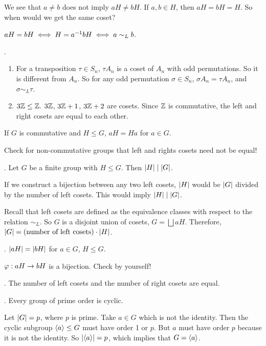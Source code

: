 We see that \(a \neq b\) does not imply \(aH \neq bH\). If \(a, b\in H\), then \(aH = bH = H\). So when would we get the same coset?

\rmk\(aH = bH \iff H = a^{-1} b H \iff a \sim_L b\).

\ex.
\begin{enumerate}
    \item For a transposition \(\tau \in S_n\), \(\tau A_n\) is a coset of \(A_n\) with odd permutations. So it is different from \(A_n\). So for any odd permutation \(\sigma \in S_n\), \(\sigma A_n = \tau A_n\), and \(\sigma \sim_L \tau\).
    \item \(3\mathbb{Z} \leq \mathbb{Z}\). \(3\mathbb{Z}\), \(3\mathbb{Z} + 1\), \(3\mathbb{Z} + 2\) are cosets. Since \(\mathbb{Z}\) is commutative, the left and right cosets are equal to each other.
\end{enumerate}

\rmk If \(G\) is commutative and \(H \leq G\), \(aH = Ha\) for \(a \in G\).

Check for non-commutative groups that left and rights cosets need not be equal!

\medskip

\thm.  Let \(G\) be a finite group with \(H \leq G\). Then \(\left| H \right| \mid \left| G \right|\).

\pf If we construct a bijection between any two left cosets, \(\left| H \right|\) would be \(\left| G \right|\) divided by the number of left cosets. This would imply \(\left| H \right| \mid \left| G \right|\).

Recall that left cosets are defined as the equivalence classes with respect to the relation \(\sim_L\). So \(G\) is a disjoint union of cosets, \(G = \bigsqcup aH\). Therefore, \(\left| G \right| = \text{(number of left cosets)} \cdot \left| H \right|\).

\lemma. \(\left| aH \right| = \left| bH \right|\) for \(a \in G\), \(H \leq G\).

\pf \(\varphi : aH \rightarrow bH\) is a bijection. Check by yourself!

\cor. The number of left cosets and the number of right cosets are equal.

\medskip

\cor. Every group of prime order is cyclic.

\pf Let \(\left| G \right| = p\), where \(p\) is prime. Take \(a \in G\) which is not the identity. Then the cyclic subgroup \(\left\langle a \right\rangle \leq G\) must have order 1 or \(p\). But \(a\) must have order \(p\) because it is not the identity. So \(\left| \left\langle a \right\rangle \right| = p\), which implies that \(G = \left\langle a \right\rangle\).

